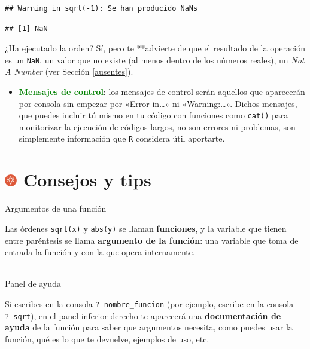 \documentclass[11pt,]{book}
\providecommand{\tightlist}{%
  \setlength{\itemsep}{0pt}\setlength{\parskip}{0pt}}
\begin{document}
\begin{verbatim}
## Warning in sqrt(-1): Se han producido NaNs
\end{verbatim}

\begin{verbatim}
## [1] NaN
\end{verbatim}

¿Ha ejecutado la orden? Sí, pero te **advierte de que el resultado de la operación es un \texttt{NaN}, un valor que no existe (al menos dentro de los números reales), un \emph{Not A Number} (ver Sección \ref{ausentes}).

\begin{itemize}
\tightlist
\item
  \textbf{\textcolor{green}{Mensajes de control}}: los mensajes de control serán aquellos que aparecerán por consola sin empezar por «Error in\ldots{}» ni «Warning:\ldots{}». Dichos mensajes, que puedes incluir tú mismo en tu código con funciones como \texttt{cat()} para monitorizar la ejecución de códigos largos, no son errores ni problemas, son simplemente información que \texttt{R} considera útil aportarte.
\end{itemize}

\hypertarget{consejos-y-tips-1}{%
\section[ Consejos y tips]{\texorpdfstring{\protect\includegraphics[width=0.04\textwidth,height=\textheight]{img/logo_info.png} Consejos y tips}{ Consejos y tips}}\label{consejos-y-tips-1}}

Argumentos de una función

Las órdenes \texttt{sqrt(x)} y \texttt{abs(y)} se llaman \textbf{funciones}, y la variable que tienen entre paréntesis se llama \textbf{argumento de la función}: una variable que toma de entrada la función y con la que opera internamente.

~\\

Panel de ayuda

Si escribes en la consola \texttt{?\ nombre\_funcion} (por ejemplo, escribe en la consola \texttt{?\ sqrt}), en el panel inferior derecho te aparecerá una \textbf{documentación de ayuda} de la función para saber que argumentos necesita, como puedes usar la función, qué es lo que te devuelve, ejemplos de uso, etc.
\end{document}
